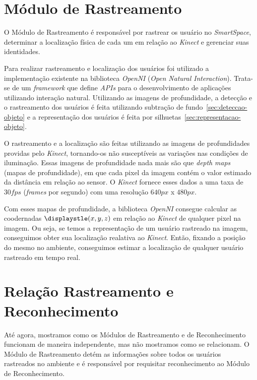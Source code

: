 \section{Módulo de Rastreamento}

	O Módulo de Rastreamento é responsável por rastrear os usuário no \textit{SmartSpace}, determinar a localização física de cada um em relação ao \textit{Kinect} e gerenciar suas identidades.

	Para realizar rastreamento e localização dos usuários foi utilizado a implementação existente na biblioteca \textit{OpenNI} (\textit{Open Natural Interaction}). Trata-se de um \textit{framework} que define \textit{APIs} para o desenvolvimento de aplicações utilizando interação natural. Utilizando as imagens de profundidade, a detecção e o rastreamento dos usuários é feita utilizando subtração de fundo~\ref{sec:deteccao-objeto} e a representação dos usuários é feita por silhuetas~\ref{sec:representacao-objeto}. 

	O rastreamento e a localização são feitas utilizando as imagens de profundidades providas pelo \textit{Kinect}, tornando-os não susceptíveis as variações nas condições de iluminação. Essas imagens de profundidade nada mais são que \textit{depth maps} (mapas de profundidade), em que cada pixel da imagem contém o valor estimado da distância em relação ao sensor. O \textit{Kinect} fornece esses dados a uma taxa de $\displaystyle 30 fps$ (\textit{frames} por segundo) com uma resolução $\displaystyle 640px$ x $\displaystyle 480px$.
	
	Com esses mapas de profundidade, a biblioteca \textit{OpenNI} consegue calcular as coodernadas $\displaystle (x,y,z)$ em relação ao \textit{Kinect} de qualquer pixel na imagem. Ou seja, se temos a representação de um usuário rastreado na imagem, conseguimos obter sua localização realativa ao \textit{Kinect}. Então, fixando a posição do mesmo no ambiente, conseguimos estimar a localização de qualquer usuário rastreado em tempo real.

\section{Relação Rastreamento e Reconhecimento}
\label{sec:rastreamento-reconheicmento}

	Até agora, mostramos como os Módulos de Rastreamento e de Reconhecimento funcionam de maneira independente, mas não mostramos como se relacionam. O Módulo de Rastreamento detém as informações sobre todos os usuários rastreados no ambiente e é responsável por requisitar reconhecimento ao Módulo de Reconhecimento.

